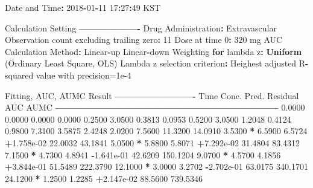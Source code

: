 \documentclass[12pt,]{krantz}
\newenvironment{Shaded}{\begin{snugshade}}{\end{snugshade}}
\newcommand{\KeywordTok}[1]{\textcolor[rgb]{0.13,0.29,0.53}{\textbf{#1}}}
\newcommand{\DecValTok}[1]{\textcolor[rgb]{0.00,0.00,0.81}{#1}}
\newcommand{\FloatTok}[1]{\textcolor[rgb]{0.00,0.00,0.81}{#1}}
\newcommand{\StringTok}[1]{\textcolor[rgb]{0.31,0.60,0.02}{#1}}
\newcommand{\ControlFlowTok}[1]{\textcolor[rgb]{0.13,0.29,0.53}{\textbf{#1}}}
\newcommand{\OperatorTok}[1]{\textcolor[rgb]{0.81,0.36,0.00}{\textbf{#1}}}
\newcommand{\NormalTok}[1]{#1}
\theoremstyle{definition}
\theoremstyle{definition}
\theoremstyle{definition}
\theoremstyle{remark}
\begin{document}
\begin{Shaded}
\begin{Highlighting}[]
{{{{{{{{\NormalTok{Date and Time}\OperatorTok{:}\StringTok{ }\DecValTok{2018}\OperatorTok{-}\DecValTok{01}\OperatorTok{-}\DecValTok{11} \DecValTok{17}\OperatorTok{:}\DecValTok{27}\OperatorTok{:}\DecValTok{49}\NormalTok{ KST}

\NormalTok{Calculation Setting}
\OperatorTok{-------------------}
\NormalTok{Drug Administration}\OperatorTok{:}\StringTok{ }\NormalTok{Extravascular}
\NormalTok{Observation count excluding trailing zero}\OperatorTok{:}\StringTok{ }\DecValTok{11}
\NormalTok{Dose at time }\DecValTok{0}\OperatorTok{:}\StringTok{ }\DecValTok{320}\NormalTok{ mg}
\NormalTok{AUC Calculation Method}\OperatorTok{:}\StringTok{ }\NormalTok{Linear}\OperatorTok{-}\NormalTok{up Linear}\OperatorTok{-}\NormalTok{down}
\NormalTok{Weighting }\ControlFlowTok{for}\NormalTok{ lambda z}\OperatorTok{:}\StringTok{ }\KeywordTok{Uniform}\NormalTok{ (Ordinary Least Square, OLS)}
\NormalTok{Lambda z selection criterion}\OperatorTok{:}\StringTok{ }\NormalTok{Heighest adjusted R}\OperatorTok{-}\NormalTok{squared value with precision=}\FloatTok{1e-4}


\NormalTok{Fitting, AUC, AUMC Result}
\OperatorTok{-------------------------}
\StringTok{      }\NormalTok{Time         Conc.      Pred.   Residual       AUC       AUMC}
\OperatorTok{---------------------------------------------------------------------}
\StringTok{     }\FloatTok{0.0000}       \FloatTok{0.0000}                           \FloatTok{0.0000}     \FloatTok{0.0000}
     \FloatTok{0.2500}       \FloatTok{3.0500}                           \FloatTok{0.3813}     \FloatTok{0.0953}
     \FloatTok{0.5200}       \FloatTok{3.0500}                           \FloatTok{1.2048}     \FloatTok{0.4124}
     \FloatTok{0.9800}       \FloatTok{7.3100}                           \FloatTok{3.5875}     \FloatTok{2.4248}
     \FloatTok{2.0200}       \FloatTok{7.5600}                          \FloatTok{11.3200}    \FloatTok{14.0910}
     \FloatTok{3.5300} \OperatorTok{*}\StringTok{     }\FloatTok{6.5900}     \FloatTok{6.5724} \OperatorTok{+}\FloatTok{1.758e-02}    \FloatTok{22.0032}    \FloatTok{43.1841}
     \FloatTok{5.0500} \OperatorTok{*}\StringTok{     }\FloatTok{5.8800}     \FloatTok{5.8071} \OperatorTok{+}\FloatTok{7.292e-02}    \FloatTok{31.4804}    \FloatTok{83.4312}
     \FloatTok{7.1500} \OperatorTok{*}\StringTok{     }\FloatTok{4.7300}     \FloatTok{4.8941} \OperatorTok{-}\FloatTok{1.641e-01}    \FloatTok{42.6209}   \FloatTok{150.1204}
     \FloatTok{9.0700} \OperatorTok{*}\StringTok{     }\FloatTok{4.5700}     \FloatTok{4.1856} \OperatorTok{+}\FloatTok{3.844e-01}    \FloatTok{51.5489}   \FloatTok{222.3790}
    \FloatTok{12.1000} \OperatorTok{*}\StringTok{     }\FloatTok{3.0000}     \FloatTok{3.2702} \OperatorTok{-}\FloatTok{2.702e-01}    \FloatTok{63.0175}   \FloatTok{340.1701}
    \FloatTok{24.1200} \OperatorTok{*}\StringTok{     }\FloatTok{1.2500}     \FloatTok{1.2285} \OperatorTok{+}\FloatTok{2.147e-02}    \FloatTok{88.5600}   \FloatTok{739.5346}

}}}}}}}}
\end{Highlighting}
\end{Shaded}
\end{document}
